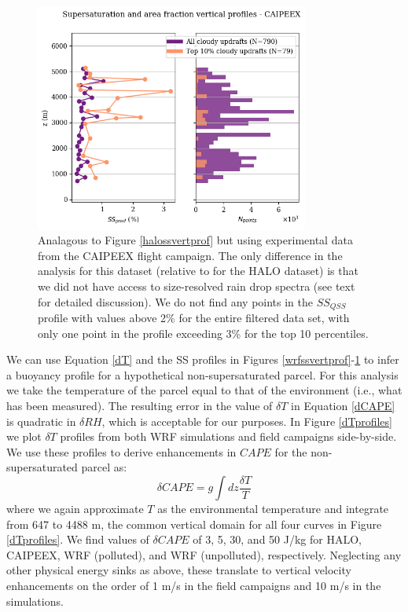 \documentclass{article}
\begin{document}
\begin{figure}[ht]
    \centering
    \includegraphics[width=9cm]{caipeex/ss_pred_vs_z_figure.png}
    \caption{Analagous to Figure \ref{halossvertprof} but using experimental data from the CAIPEEX flight campaign. The only difference in the analysis for this dataset (relative to for the HALO dataset) is that we did not have access to size-resolved rain drop spectra (see text for detailed discussion). We do not find any points in the $SS_{QSS}$ profile with values above 2\% for the entire filtered data set, with only one point in the profile exceeding 3\% for the top 10 percentiles.}
    \label{caipeexssvertprof}
\end{figure}

We can use Equation \ref{dT} and the SS profiles in Figures \ref{wrfssvertprof}-\ref{caipeexssvertprof} to infer a buoyancy profile for a hypothetical non-supersaturated parcel. For this analysis we take the temperature of the parcel equal to that of the environment (i.e., what has been measured). The resulting error in the value of $\delta T$ in Equation \ref{dCAPE} is quadratic in $\delta RH$, which is acceptable for our purposes. In Figure \ref{dTprofiles} we plot $\delta T$ profiles from both WRF simulations and field campaigns side-by-side. We use these profiles to derive enhancements in $CAPE$ for the non-supersaturated parcel as:
\begin{equation}
\label{dCAPE}
\delta CAPE = g \int dz \frac{\delta T}{T}
\end{equation}
where we again approximate $T$ as the environmental temperature and integrate from 647 to 4488 m, the common vertical domain for all four curves in Figure \ref{dTprofiles}. We find values of $\delta CAPE$ of 3, 5, 30, and 50 J/kg for HALO, CAIPEEX, WRF (polluted), and WRF (unpolluted), respectively. Neglecting any other physical energy sinks as above, these translate to vertical velocity enhancements on the order of 1 m/s in the field campaigns and 10 m/s in the simulations.
\end{document}
